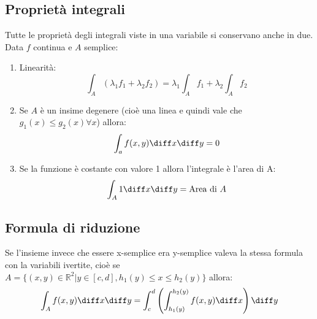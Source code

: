 \subsection{Proprietà integrali}
Tutte le proprietà degli integrali viste in una variabile si conservano anche 
in due. Data $f$ continua e $A$ semplice:
\begin{enumerate}
    \item Linearità:
        \begin{equation*}
            \int_A (\lambda_1 f_1 + \lambda_2 f_2) = \lambda_1 \int_A f_1 +
            \lambda_2 \int_A f_2
        \end{equation*}

    \item Se $A$ è un insime degenere (cioè una linea e quindi vale che $g_1(x)
        \leq g_2(x) \forall x$) allora:
        \begin{equation*}
            \int_a f(x, y) \diff x \diff y = 0
        \end{equation*}

    \item Se la funzione è costante con valore 1 allora l'integrale è l'area di 
        A:
        \begin{equation*}
            \int_A 1 \diff x \diff y = \text{Area di } A
        \end{equation*}
\end{enumerate}

\subsection{Formula di riduzione}
Se l'insieme invece che essere x-semplice era y-semplice valeva la stessa
formula con la variabili ivertite, cioè se $A = \{(x, y) \in \mathbb{R}^2 | 
y \in [c, d], h_1(y) \leq x \leq h_2(y)\}$ allora:
\begin{equation*}
    \int_A f(x, y) \diff x \diff y = \int_c^d \left(\int_{h_1(y)}^{h_2(y)} 
    f(x, y) \diff x \right) \diff y
\end{equation*}
